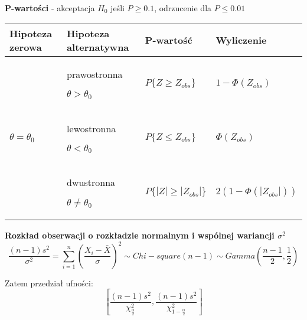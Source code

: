 \documentclass[a4paper]{article}
\begin{document}
    \textbf{P-wartości} - akceptacja $H_0$ jeśli $P \geq 0.1$, odrzucenie dla $P \leq 0.01$
    \begin{table}[H]
        \begin{center}
            \begin{tabular}{ p{} |p{} |p{} |p{}}
                \toprule
                Hipoteza zerowa & Hipoteza alternatywna & P-wartość & Wyliczenie\\
                \toprule
                \multirow{3}{*}{$\theta = \theta_0$} & prawostronna

                $\theta > \theta_0$ & $P\{Z \geq Z_{obs}\}$ & $1 - \Phi(Z_{obs})$\\

                & lewostronna

                $\theta < \theta_0$ & $P\{Z \leq Z_{obs}\}$ & $\Phi(Z_{obs})$\\

                & dwustronna

                $\theta \neq \theta_0$ & $P\{|Z| \geq |Z_{obs}|\}$ & $2(1 - \Phi(|Z_{obs}|))$\\

                \bottomrule
            \end{tabular}
        \end{center}
    \end{table}

    \textbf{Rozkład obserwacji o rozkładzie normalnym i wspólnej wariancji $\sigma^2$}
    \begin{equation*}
        \frac{(n-1)s^2}{\sigma^2} = \sum_{i=1}^{n} \left ( \frac{X_i - \bar{X}}{\sigma} \right )^2 \sim Chi-square(n-1) \sim Gamma \left ( \frac{n-1}{2}, \frac{1}{2} \right )
    \end{equation*}

    Zatem przedział ufności:
    \begin{equation*}
        \left [ \frac{(n-1)s^2}{\chi^2_{\frac{\alpha}{2}}}, \frac{(n-1)s^2}{\chi_{1 - \frac{\alpha}{2}}^2} \right ]
    \end{equation*}
\end{document}
